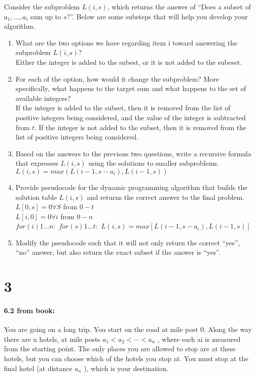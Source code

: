 \documentclass[12pt]{article}
\begin{document}
Consider the subproblem $L(i, s)$, which returns the answer of “Does a
subset of $a_1, \dots, a_i$ sum up to $s$?”.  Below are some substeps
that will help you develop your algorithm.  
\begin{enumerate}
    \item What are the two options we have regarding item i toward answering the subproblem $L(i, s)$? \\
        Either the integer is added to the subest, or it is not added to the subeset. 

    \item For each of the option, how would it change the subproblem? More
    specifically, what happens to the target sum and what happens to the set
    of available integers? \\
        If the integer is added to the subset, then it is removed from the list of positive integers being considered, and the value of the integer is subtracted from $t$.
        If the integer is not added to the subset, then it is removed from the list of positive integers being considered. 

    \item Based on the answers to the previous two questions, write a
    recursive formula that expresses $L(i, s)$ using the solutions to smaller
    subproblems.  \\
        $L(i, s) = max( L(i-1, s-a_i) , L(i-1, s) )$

    \item Provide pseudocode for the dynamic
    programming algorithm that builds the solution table $L(i, s)$ and returns
    the correct answer to the final problem.  
        $L[0,s] = 0 \forall S$ from $0 - t$\\
        $L[i,0] = 0 \forall i$ from $0 - n$\\
        $for (i) 1 ... n:$
            $for (s) 1 ... t:$
                $L(i,s) = max [ L(i-1,s-a_i) , L(i-1,s) ]$
        
    \item Modify the pseudocode such that it will not only return the correct “yes”, “no” answer, but also return the exact subset if the answer is “yes”.
        
\end{enumerate}

\section*{3}
\paragraph{6.2 from book:}
You are going on a long trip. You start on the road at mile post 0. Along the way there are n
hotels, at mile posts $a_1 < a_2 < \cdots < a_n$ , where each ai is measured from the starting point. The
only places you are allowed to stop are at these hotels, but you can choose which of the hotels
you stop at. You must stop at the final hotel (at distance $a_n$ ), which is your destination.
\end{document}
